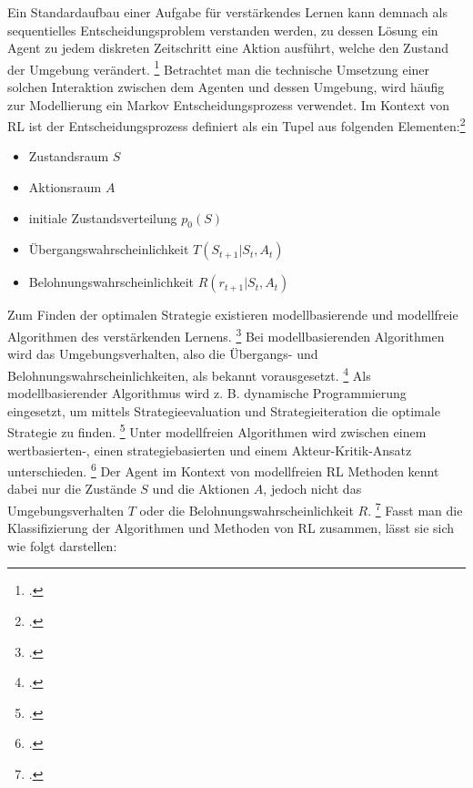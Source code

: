 Ein Standardaufbau einer Aufgabe für verstärkendes Lernen kann demnach als sequentielles Entscheidungsproblem verstanden werden, zu dessen Lösung ein Agent zu jedem diskreten Zeitschritt eine Aktion ausführt, welche den Zustand der Umgebung verändert. \footcite[Vgl.][S. 2]{Zhao.2020}
Betrachtet man die technische Umsetzung einer solchen Interaktion zwischen dem Agenten und dessen Umgebung, wird häufig zur Modellierung ein Markov Entscheidungsprozess verwendet.
Im Kontext von RL ist der Entscheidungsprozess definiert als ein Tupel aus folgenden Elementen:\footcite[Vgl.][S. 2]{Zhang.2018}
\begin{itemize}
    \item Zustandsraum $S$
    \item Aktionsraum $A$
    \item initiale Zustandsverteilung $p_{0}(S)$
    \item Übergangswahrscheinlichkeit $T(S_{t+1}|S_{t},A_{t})$
    \item Belohnungswahrscheinlichkeit $R(r_{t+1}|S_{t},A_{t})$
\end{itemize}

Zum Finden der optimalen Strategie existieren modellbasierende und modellfreie Algorithmen des verstärkenden Lernens. \footcite[Vgl.][S. 3]{Wang.2020}
Bei modellbasierenden Algorithmen wird das Umgebungsverhalten, also die Übergangs- und Belohnungswahrscheinlichkeiten, als bekannt vorausgesetzt. \footcite[Vgl.][S. 3]{Wang.2020}
Als modellbasierender Algorithmus wird z. B. dynamische Programmierung eingesetzt, um mittels Strategieevaluation und Strategieiteration die optimale Strategie zu finden. \footcite[Vgl.][S. 5]{Li.2019}
Unter modellfreien Algorithmen wird zwischen einem wertbasierten-, einen strategiebasierten und einem Akteur-Kritik-Ansatz unterschieden. \footcite[Vgl.][S. 5]{Li.2019}
Der Agent im Kontext von modellfreien RL Methoden kennt dabei nur die Zustände $S$ und die Aktionen $A$, jedoch nicht das Umgebungsverhalten $T$ oder die Belohnungswahrscheinlichkeit $R$. \footcite[Vgl.][S. 2]{Cutler.2014}
Fasst man die Klassifizierung der Algorithmen und Methoden von RL zusammen, lässt sie sich wie folgt darstellen:

